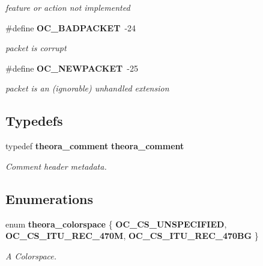 \begin{CompactItemize}
\begin{CompactList}\small\item\em feature or action not implemented \item\end{CompactList}\item 
\#define {\bf OC\_\-BADPACKET}\ -24\label{theora_8h_a7}

\begin{CompactList}\small\item\em packet is corrupt \item\end{CompactList}\item 
\#define {\bf OC\_\-NEWPACKET}\ -25\label{theora_8h_a8}

\begin{CompactList}\small\item\em packet is an (ignorable) unhandled extension \item\end{CompactList}\end{CompactItemize}
\subsection*{Typedefs}
\begin{CompactItemize}
\item 
typedef {\bf theora\_\-comment} {\bf theora\_\-comment}
\begin{CompactList}\small\item\em Comment header metadata. \item\end{CompactList}\end{CompactItemize}
\subsection*{Enumerations}
\begin{CompactItemize}
\item 
enum {\bf theora\_\-colorspace} \{ {\bf OC\_\-CS\_\-UNSPECIFIED}, 
{\bf OC\_\-CS\_\-ITU\_\-REC\_\-470M}, 
{\bf OC\_\-CS\_\-ITU\_\-REC\_\-470BG}
 \}
\begin{CompactList}\small\item\em A Colorspace. \item\end{CompactList}\end{CompactItemize}
